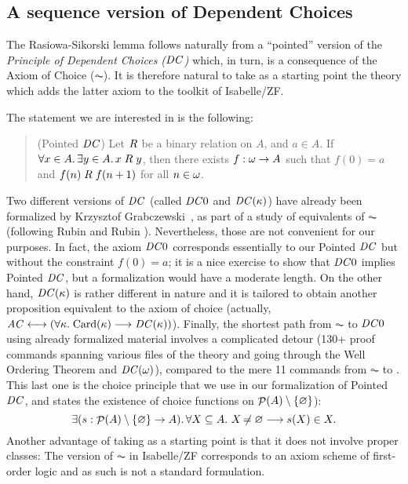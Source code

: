 \subsection{A sequence version of Dependent
  Choices}\label{sec:sequence-version-dc} 
The Rasiowa-Sikorski lemma follows naturally from a ``pointed''
version of   the \emph{Principle of Dependent Choices ($\mathit{DC}$)} which,
in turn, is a consequence of the Axiom of Choice ($\AC$). It is
therefore natural to take as a starting point the theory 
which adds the latter axiom to the toolkit of Isabelle/ZF.

The statement we are interested in is the following:
\begin{quote}
  (Pointed $\mathit{DC}$) Let $\mathrel{R}$ be a binary relation on $A$, and $a\in A$. If
  $\forall x\in A.\,  \exists y\in A.\, x\mathrel{R} y$, then there exists
  $f:\omega\to A$ such that $f(0)=a$ and $f(n)\mathrel{R} f(n+1)$ for all
  $n\in\omega$.
\end{quote}

Two different versions of $\mathit{DC}$ (called $\mathit{DC}0$ and $\mathit{DC}(\kappa)$) have
already been formalized by Krzysztof
Grabczewski~\cite{DBLP:journals/jar/PaulsonG96}, as part of a study of
equivalents of $\AC$ (following Rubin and Rubin
\cite{rubin1985equivalents}). Nevertheless, those are not convenient
for our purposes. In fact, the axiom $\mathit{DC}0$ corresponds essentially to
our Pointed $\mathit{DC}$ but without the constraint $f(0)=a$; it is a nice
exercise to show that $\mathit{DC}0$ implies Pointed $\mathit{DC}$, but a
formalization would have a moderate length. On the other hand,
$\mathit{DC}(\kappa)$ is rather different in nature and it is tailored to
obtain another proposition equivalent to the axiom of choice
(actually,
$\mathit{AC}\longleftrightarrow (\forall \kappa .\;
\mathrm{Card}(\kappa)\longrightarrow \mathit{DC}(\kappa))$).  Finally, the
shortest path from $\AC$ %
to $\mathit{DC}0$ using already formalized
material involves a complicated detour (130+ proof commands spanning
various files of the  theory and going through the Well
Ordering Theorem and  $\mathit{DC}(\omega)$), compared to the mere 11 commands from $\AC$ to
. This last
one is the
choice principle that we use in our formalization of Pointed $\mathit{DC}$, and states 
the existence of
choice functions on $\mathop{\mathcal{P}}(A)\setminus \{\varnothing\}$):
\[
\exists (s: \mathop{\mathcal{P}}(A)\setminus \{\varnothing\}\to A). \, \forall X\subseteq A.\ X\not\nobreak\mkern -2mu = \varnothing \longrightarrow
s(X) \in X.
\]
Another advantage of taking
 as a
starting point is that it does not involve proper classes: The version
of  $\AC$ in Isabelle/ZF corresponds to an axiom scheme of first-order
logic and as such is not a standard formulation. 

